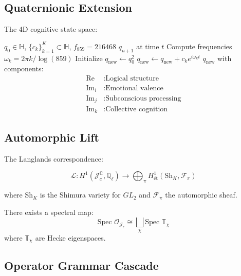 \documentclass[12pt]{article}
\begin{document}
\subsection{Quaternionic Extension}

The 4D cognitive state space:

\begin{algorithm}[H]
\caption{Quaternionic Fractal Evolution}
\begin{algorithmic}[1]
\Require $q_0 \in \mathbb{H}$, $\{c_k\}_{k=1}^K \subset \mathbb{H}$, $f_{859}=216468$
\Ensure $q_{n+1}$ at time $t$
\State Compute frequencies $\omega_k = 2\pi k/\log(859)$
\State Initialize $q_{\text{new}} \gets q_0^2$
    \State $q_{\text{new}} \gets q_{\text{new}} + c_k e^{i\omega_k t}$
\EndFor
\State \Return $q_{\text{new}}$ with components:
\begin{align*}
\text{Re} &: \text{Logical structure} \\
\text{Im}_i &: \text{Emotional valence} \\
\text{Im}_j &: \text{Subconscious processing} \\
\text{Im}_k &: \text{Collective cognition}
\end{align*}
\end{algorithmic}
\end{algorithm}

\subsection{Automorphic Lift}

The Langlands correspondence:

\begin{equation}
\mathcal{L}: H^1(\mathcal{J}_c^{\mathbb{C}}, \mathbb{Q}_\ell) \to \bigoplus_\pi H^1_{\text{ét}}(\text{Sh}_K, \mathcal{F}_\pi)
\end{equation}

where $\text{Sh}_K$ is the Shimura variety for $GL_2$ and $\mathcal{F}_\pi$ the automorphic sheaf.

\begin{theorem}
There exists a spectral map:
\begin{equation}
\text{Spec } \mathcal{O}_{\mathcal{J}_c} \cong \bigsqcup_{\chi} \text{Spec } \mathbb{T}_\chi
\end{equation}
where $\mathbb{T}_\chi$ are Hecke eigenspaces.
\end{theorem}

\subsection{Operator Grammar Cascade}
\end{document}
